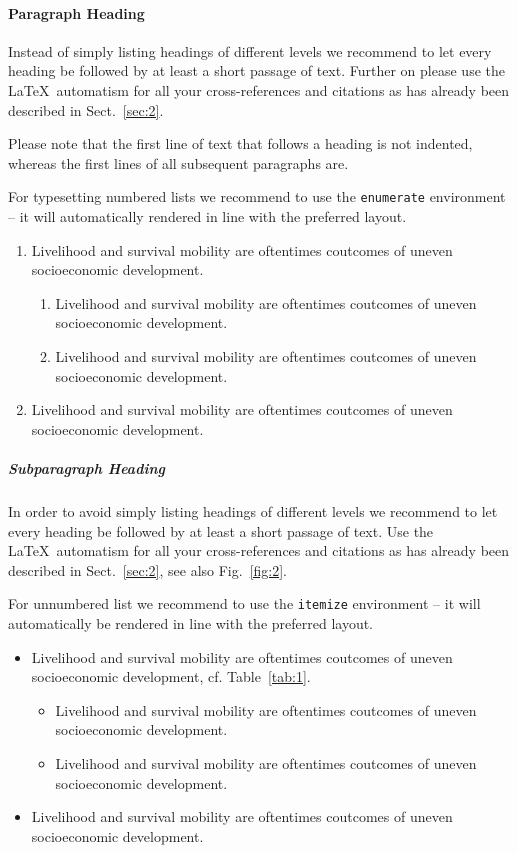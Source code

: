 \documentclass[graybox]{svmult}
\begin{document}
\paragraph{Paragraph Heading} %
Instead of simply listing headings of different levels we recommend to let every heading be followed by at least a short passage of text.  Further on please use the \LaTeX\ automatism for all your cross-references and citations as has already been described in Sect.~\ref{sec:2}.

Please note that the first line of text that follows a heading is not indented, whereas the first lines of all subsequent paragraphs are.

For typesetting numbered lists we recommend to use the \verb|enumerate| environment -- it will automatically rendered in line with the preferred layout.

\begin{enumerate}
\item{Livelihood and survival mobility are oftentimes coutcomes of uneven socioeconomic development.}
\begin{enumerate}
\item{Livelihood and survival mobility are oftentimes coutcomes of uneven socioeconomic development.}
\item{Livelihood and survival mobility are oftentimes coutcomes of uneven socioeconomic development.}
\end{enumerate}
\item{Livelihood and survival mobility are oftentimes coutcomes of uneven socioeconomic development.}
\end{enumerate}


\subparagraph{Subparagraph Heading} In order to avoid simply listing headings of different levels we recommend to let every heading be followed by at least a short passage of text. Use the \LaTeX\ automatism for all your cross-references and citations as has already been described in Sect.~\ref{sec:2}, see also Fig.~\ref{fig:2}.

For unnumbered list we recommend to use the \verb|itemize| environment -- it will automatically be rendered in line with the preferred layout.

\begin{itemize}
\item{Livelihood and survival mobility are oftentimes coutcomes of uneven socioeconomic development, cf. Table~\ref{tab:1}.}
\begin{itemize}
\item{Livelihood and survival mobility are oftentimes coutcomes of uneven socioeconomic development.}
\item{Livelihood and survival mobility are oftentimes coutcomes of uneven socioeconomic development.}
\end{itemize}
\item{Livelihood and survival mobility are oftentimes coutcomes of uneven socioeconomic development.}
\end{itemize}
\end{document}
